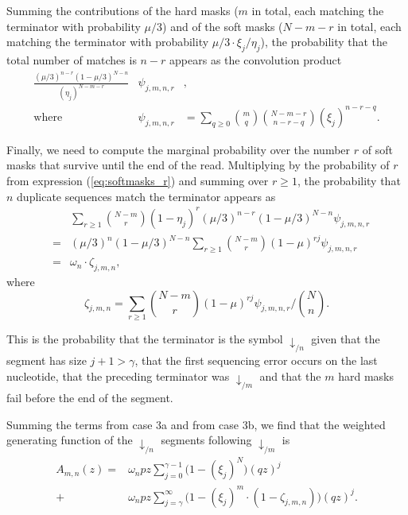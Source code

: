 \documentclass{article}
\begin{document}
Summing the contributions of the hard masks ($m$ in total, each matching
the terminator with probability $\mu/3$) and of the soft masks ($N-m-r$ in
total, each matching the terminator with probability
$\mu/3\cdot\xi_j/\eta_j$), the probability that the total number of
matches is $n-r$ appears as the convolution product
\begin{eqnarray*}
\frac{(\mu/3)^{n-r}(1-\mu/3)^{N-n}}{(\eta_j)^{N-m-r}}
&\psi_{j,m,n,r}&, \\
\text{where }
&\psi_{j,m,n,r}& = \sum_{q \geq 0}{m \choose q}{N-m-r \choose n-r-q}
(\xi_j)^{n-r-q}.
\end{eqnarray*}

Finally, we need to compute the marginal probability over the number $r$
of soft masks that survive until the end of the read. Multiplying by the
probability of $r$ from expression (\ref{eq:softmasks_r}) and summing over
$r \geq 1$, the probability that $n$ duplicate sequences match the
terminator appears as
\begin{eqnarray*}
&\;& \sum_{r\geq1} {N-m \choose r}
(1 - \eta_j)^r (\mu/3)^{n-r} (1-\mu/3)^{N-n} \psi_{j,m,n,r} \\
&=& (\mu/3)^n(1-\mu/3)^{N-n} \sum_{r\geq1} {N-m \choose r}
  (1 - \mu)^{rj} \psi_{j,m,n,r} \\
&=& \omega_n \cdot \zeta_{j,m,n},
\end{eqnarray*}
where
\begin{equation}
\label{eq:zeta}
\zeta_{j,m,n} = \sum_{r\geq1} {N-m \choose r}
(1-\mu)^{rj} \psi_{j,m,n,r} \bigg/ {N \choose n}.
\end{equation}

This is the probability that the terminator is the symbol
$\downarrow_{/n}$ given that the segment has size $j+1 > \gamma$, that
the first sequencing error occurs on the last nucleotide, that the
preceding terminator was $\downarrow_{/m}$ and that the $m$ hard masks
fail before the end of the segment.

Summing the terms from case 3a and from case 3b, we find that the weighted
generating function of the $\downarrow_{/n}$ segments following
$\downarrow_{/m}$ is
\begin{equation}
\begin{split}
\label{eq:A}
A_{m,n}(z) =
&\omega_n pz \sum_{j=0}^{\gamma-1} \Big(1 - (\xi_j)^N \Big)
  (qz)^j \\
+ &\omega_n pz \sum_{j=\gamma}^\infty \Big(1 - (\xi_j)^m \cdot
(1- \zeta_{j,m,n}) \Big) (qz)^j.
\end{split}
\end{equation}
\end{document}
